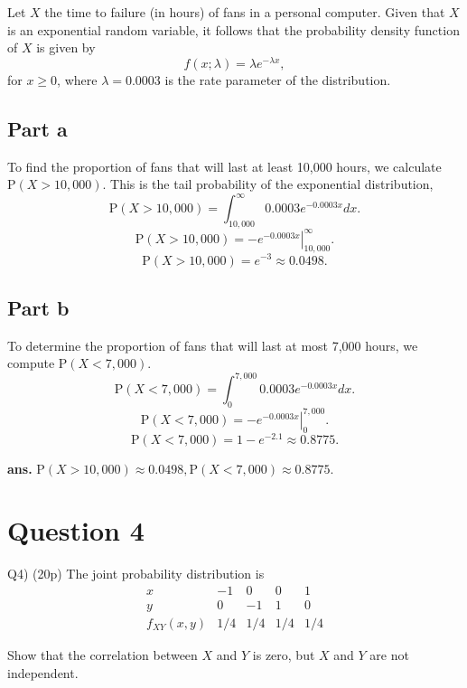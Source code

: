 \documentclass[12pt]{article}
\begin{document}
Let \( X \) the time to failure (in hours) of fans in a personal computer. Given that \( X \) is an exponential random variable, it follows that the probability density function of \( X \) is given by \[ f(x; \lambda) = \lambda e^{-\lambda x}, \] for \( x \geq 0 \), where \( \lambda = 0.0003 \) is the rate parameter of the distribution.

\subsection*{Part a}

To find the proportion of fans that will last at least 10,000 hours, we calculate \( \mathrm{P}(X > 10,000) \). This is the tail probability of the exponential distribution, \[ \mathrm{P}(X > 10,000) = \int_{10,000}^{\infty} 0.0003 e^{-0.0003 x} dx. \]\[ \mathrm{P}(X > 10,000) = -\left.e^{-0.0003 x}\right|_{10,000}^{\infty}. \] \[ \mathrm{P}(X > 10,000) = e^{-3} \approx 0.0498. \]
\AnswerTag

\subsection*{Part b}

To determine the proportion of fans that will last at most 7,000 hours, we compute \( \mathrm{P}(X < 7,000) \). \[ \mathrm{P}(X < 7,000) = \int_{0}^{7,000} 0.0003 e^{-0.0003 x} dx. \] \[ \mathrm{P}(X < 7,000) = -\left.e^{-0.0003 x}\right|_{0}^{7,000}. \] \[ \mathrm{P}(X < 7,000) = 1 - e^{-2.1} \approx 0.8775. \]

\AnswerTag


\vfill
\begin{flushright}
\textbf{ans.} \(\mathrm{P}(X > 10,000) \approx 0.0498, \mathrm{P}(X < 7,000) \approx 0.8775.\)
\end{flushright}



\newpage
\section*{Question 4}

\begin{q}
Q4) (20p) The joint probability distribution is
\[
\begin{array}{lccll}
 x & -1 & 0 & 0 & 1 \\
\hline y & 0 & -1 & 1 & 0 \\
\hline f_{X Y}(x, y) & 1 / 4 & 1 / 4 & 1 / 4 & 1 / 4

\end{array}
\]

Show that the correlation between \(X\) and \(Y\) is zero, but \(X\) and \(Y\) are not independent.
\end{q}
\end{document}
